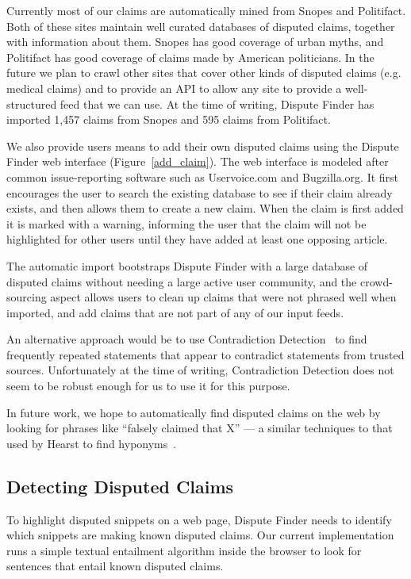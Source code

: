 \documentclass{www2010-submission}
\newcommand{\todo}[1]{}
\begin{document}
Currently most of our claims are automatically mined from Snopes and Politifact. Both of these sites maintain well curated databases of disputed claims, together with information about them. Snopes has good coverage of urban myths, and Politifact has good coverage of claims made by American politicians. In the future we plan to crawl other sites that cover other kinds of disputed claims (e.g. medical claims) and to provide an API to allow any site to provide a well-structured feed that we can use. At the time of writing, Dispute Finder has imported 1,457 claims from Snopes and 595 claims from Politifact. 

We also provide users means to add their own disputed claims using the Dispute Finder web interface (Figure~\ref{add_claim}). The web interface is modeled after common issue-reporting software such as Uservoice.com and Bugzilla.org. It first encourages the user to search the existing database to see if their claim already exists, and then allows them to create a new claim. When the claim is first added it is marked with a warning, informing the user that the claim will not be highlighted for other users until they have added at least one opposing article.

The automatic import bootstraps Dispute Finder with a large database of disputed claims without needing a large active user community, and the crowd-sourcing aspect allows users to clean up claims that were not phrased well when imported, and add claims that are not part of any of our input feeds.

An alternative approach would be to use Contradiction Detection~\cite{Ritter} to find frequently repeated statements that appear to contradict statements from trusted sources. Unfortunately at the time of writing, Contradiction Detection does not seem to be robust enough for us to use it for this purpose.

In future work, we hope to automatically find disputed claims on the web by looking for phrases like ``falsely claimed that X'' --- a similar techniques to that used by Hearst to find hyponyms~\cite{Hearst1992}. 

\todo{Say how many disputed claims}
\todo{talk about duplicates}
\todo{Actually import the Politifact data}


\subsection{Detecting Disputed Claims}

To highlight disputed snippets on a web page, Dispute Finder needs to identify which snippets are making known disputed claims. Our current implementation runs a simple textual entailment algorithm inside the browser to look for sentences that entail known disputed claims. 
\end{document}
